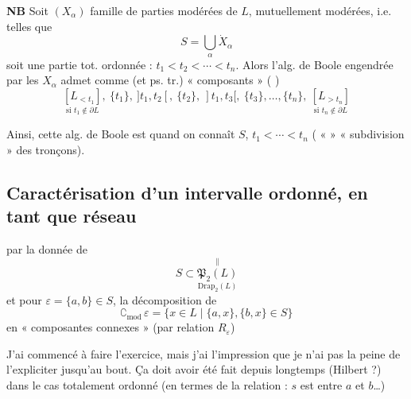 \documentclass[11pt,a4paper]{article}
\begin{document}
\textbf{NB} Soit $(X_{\alpha})$ famille  de parties modérées de $L$,  mutuellement modérées, i.e. telles que
\[
  S = \bigcup_{\alpha} \dot{X}_{\alpha}
\]
soit une partie tot. ordonnée : $t_1 < t_2 < \cdots < t_n$. Alors l'alg. de Boole engendrée par les $X_{\alpha}$  admet comme   (et ps. tr.) « composants » (\ill{} \ill{} \ill{} \ill{}) \ill{} \ill{}
\[
  \underset{\text{si } t_1 \notin \partial L}{[L_{<t_1}]},\ \{t_1\},\ ]t_1, t_2[,\ \{t_2\},\ ]t_1, t_3[,\ \{t_3\}, \ldots, \{t_n\},\ \underset{\text{si } t_n \notin \partial L}{[L_{>t_n}]}
\]
\note{« $]t_1, t_3[$ » tel qu'il se lit ; on attend $]t_2, t_3[$}

Ainsi, cette alg. de Boole est  quand on connaît $S$,  \ill{} \ill{} $t_1 < \cdots < t_n$ (\ill{} «  »  « subdivision » des tronçons).

\subsection{Caractérisation d'un intervalle ordonné, en tant que réseau}

par la donnée de
\[
  S \subset \underset{\displaystyle \mathrm{Drap}_2(L)}{\overset{\|}{\mathfrak{P}_2(L)}}
\]
et pour $\varepsilon = \{a,b\} \in S$, la décomposition de 
\[
  \complement_{\mathrm{mod}}\, \varepsilon = \bigl\{ x \in L \;\big|\; \{a,x\}, \{b,x\} \in S \bigr\}
\]
en « composantes connexes » (par relation $R_{\varepsilon}$)

J'ai commencé à faire l'exercice, mais j'ai l'impression que je n'ai pas la peine de l'expliciter jusqu'au bout. Ça doit avoir été fait depuis longtemps (Hilbert ?) dans le cas totalement ordonné  (en termes de la relation : $s$ est entre $a$ et $b$…)
\end{document}
